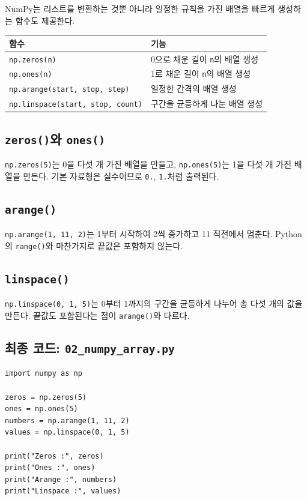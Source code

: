 \documentclass[11pt,a4paper]{article}
\begin{document}
NumPy는 리스트를 변환하는 것뿐 아니라 일정한 규칙을 가진 배열을 빠르게 생성하는 함수도 제공한다.

\begin{center}
\begin{tabular}{ll}
\toprule
함수 & 기능 \\
\midrule
\texttt{np.zeros(n)} & 0으로 채운 길이 \texttt{n}의 배열 생성 \\
\texttt{np.ones(n)} & 1로 채운 길이 \texttt{n}의 배열 생성 \\
\texttt{np.arange(start, stop, step)} & 일정한 간격의 배열 생성 \\
\texttt{np.linspace(start, stop, count)} & 구간을 균등하게 나눈 배열 생성 \\
\bottomrule
\end{tabular}
\end{center}

\subsection{\texttt{zeros()}와 \texttt{ones()}}

\texttt{np.zeros(5)}는 0을 다섯 개 가진 배열을 만들고, \texttt{np.ones(5)}는 1을 다섯 개 가진 배열을 만든다. 기본 자료형은 실수이므로 \texttt{0.}, \texttt{1.}처럼 출력된다.

\subsection{\texttt{arange()}}

\texttt{np.arange(1, 11, 2)}는 1부터 시작하여 2씩 증가하고 11 직전에서 멈춘다. Python의 \texttt{range()}와 마찬가지로 끝값은 포함하지 않는다.

\subsection{\texttt{linspace()}}

\texttt{np.linspace(0, 1, 5)}는 0부터 1까지의 구간을 균등하게 나누어 총 다섯 개의 값을 만든다. 끝값도 포함된다는 점이 \texttt{arange()}와 다르다.

\subsection{최종 코드: \texttt{02\_numpy\_array.py}}

\begin{lstlisting}
import numpy as np

zeros = np.zeros(5)
ones = np.ones(5)
numbers = np.arange(1, 11, 2)
values = np.linspace(0, 1, 5)

print("Zeros :", zeros)
print("Ones :", ones)
print("Arange :", numbers)
print("Linspace :", values)
\end{lstlisting}
\end{document}
